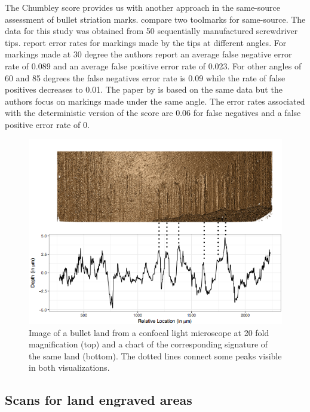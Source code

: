 \documentclass[12pt]{article}
\begin{document}
The Chumbley score provides us with another approach in the same-source
assessment of bullet striation marks. \citet{chumbley} compare two
toolmarks for same-source. The data for this study was obtained from 50
sequentially manufactured screwdriver tips. \citet{chumbley} report
error rates for markings made by the tips at different angles. For
markings made at 30 degree the authors report an average false negative
error rate of 0.089 and an average false positive error rate of 0.023.
For other angles of 60 and 85 degrees the false negatives error rate is
0.09 while the rate of false positives decreases to 0.01. The paper by
\citet{hadler} is based on the same data but the authors focus on
markings made under the same angle. The error rates associated with the
deterministic version of the score are 0.06 for false negatives and a
false positive error rate of 0.

\begin{figure}
\centering
\includegraphics[width=\textwidth]{images/B6-B2-L6-rescaled.png}


\caption{\label{fig:rgl} Image of a bullet land from a confocal light microscope at 20 fold magnification (top) and a chart of the corresponding signature of the same land (bottom). The dotted lines connect some peaks visible in both visualizations.}

\end{figure}

\subsection{Scans for land engraved
areas}\label{scans-for-land-engraved-areas}
\end{document}
